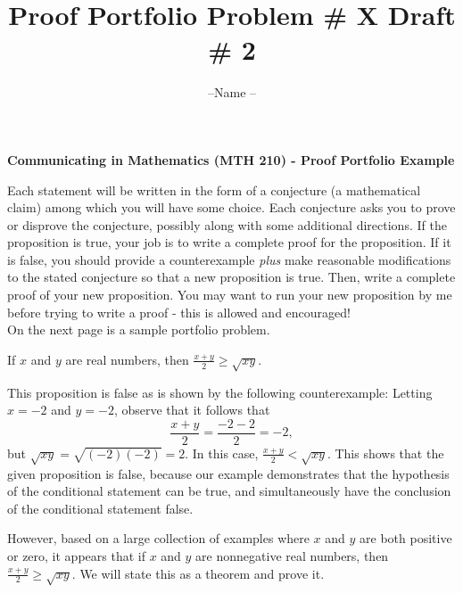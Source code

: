 \documentclass[12pt]{article}
\begin{document}
\begin{center} \textbf{\Large{Communicating in Mathematics (MTH 210)  - Proof Portfolio Example }} \\
\end{center}

Each statement will be written in the form of a conjecture (a mathematical claim) among which you will have some choice.  Each conjecture asks you to prove or disprove the conjecture, possibly along with some additional directions. 
If the proposition is true, your job is to write a complete proof for the proposition.  If it is false, you should provide a counterexample \emph{plus} make reasonable modifications to the stated conjecture so that a new proposition is true.  Then, write a complete proof of your new proposition. You may want to run your new proposition by me before trying to write a proof - this is allowed and encouraged! \\

\noindent On the next page is a sample portfolio problem.\\

\newpage

\title{Proof Portfolio Problem \# X   Draft \# 2}
\author{--Name --}
\date{}

\maketitle

  If  $x$  and  $y$  are real numbers, then   
$ \displaystyle \frac{x+y}{2} \ge \sqrt{xy}.$

\begin{center} \underline{\hspace{5in}} \end{center}

\noindent This proposition is false as is shown by the following counterexample:  Letting $x = -2$ and $y = -2$, observe that it follows that
	$$\frac{x+y}{2} = \frac{-2-2}{2} = -2,$$ 
but $\sqrt{xy} = \sqrt{(-2)(-2)} = 2.$  In this case, $\frac{x+y}{2} < \sqrt{xy}.$  This shows that the given proposition is false, because our example demonstrates that the hypothesis of the conditional statement can be true, and simultaneously have the conclusion of the conditional statement false. %

However, based on a large collection of examples where $x$ and $y$ are both positive or zero, it appears that if   $x$  and  $y$  are nonnegative real numbers, then  $\frac{x+y}{2} \ge \sqrt{xy}.$   We will state this as a theorem and prove it.
 
\end{document}
